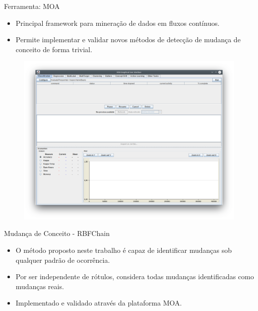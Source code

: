 \documentclass[10pt]{beamer}
\begin{document}
\begin{frame}{Ferramenta: MOA}
    \begin{itemize}
        \item<1 -> Principal framework para mineração de dados em fluxos contínuos.
        \item<1 -> Permite implementar e validar novos métodos de detecção de mudança de conceito de forma trivial.
    \end{itemize}
    \begin{figure}[H]
        \begin{center}
            \includegraphics[scale=0.25]{imagens/moa.png}
        \end{center}
    \end{figure}
\end{frame}

\begin{frame}{Mudança de Conceito - RBFChain}
    \begin{itemize}
        \item<1 -> O método proposto neste trabalho é capaz de identificar mudanças \alert{sob qualquer padrão de ocorrência}.
        \item<1 -> Por ser independente de rótulos, considera todas mudanças identificadas como \alert{mudanças reais}.
        \item<1 -> Implementado e validado através da plataforma MOA.
    \end{itemize}
\end{frame}
\end{document}
